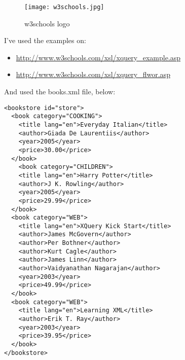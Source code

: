 \begin{figure}[h]
\centering
\texttt{[image: w3schools.jpg]}\cite{w3schools}
\caption{w3schools logo}
\label{fig:w3schools_logo}
\end{figure}

I've used the examples on:
\begin{itemize}
\item \url{http://www.w3schools.com/xsl/xquery_example.asp}
\item \url{http://www.w3schools.com/xsl/xquery_flwor.asp}
\end{itemize}

And used the books.xml file, below: 

\begin{lstlisting}[style=xml, frame=single, caption={books.xml}]
<bookstore id="store">  
  <book category="COOKING">
    <title lang="en">Everyday Italian</title>
    <author>Giada De Laurentiis</author>
    <year>2005</year>
    <price>30.00</price>
  </book>
    <book category="CHILDREN">
    <title lang="en">Harry Potter</title>
    <author>J K. Rowling</author>
    <year>2005</year>
    <price>29.99</price>
  </book>
  <book category="WEB">
    <title lang="en">XQuery Kick Start</title>
    <author>James McGovern</author>
    <author>Per Bothner</author>
    <author>Kurt Cagle</author>
    <author>James Linn</author>
    <author>Vaidyanathan Nagarajan</author>
    <year>2003</year>
    <price>49.99</price>
  </book>
  <book category="WEB">
    <title lang="en">Learning XML</title>
    <author>Erik T. Ray</author>
    <year>2003</year>
    <price>39.95</price>
  </book>
</bookstore> 
\end{lstlisting}
\newpage

